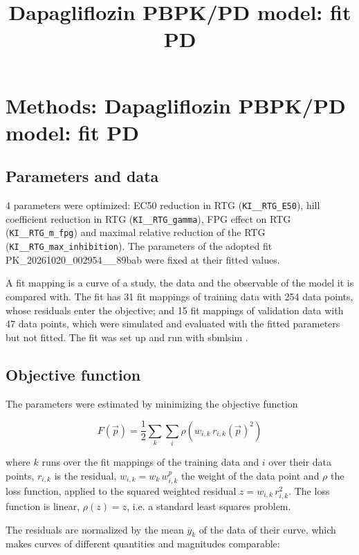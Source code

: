 \documentclass{article}
\title{Dapagliflozin PBPK/PD model: fit PD}
\date{}
\begin{document}
\maketitle

\section{Methods: Dapagliflozin PBPK/PD model: fit PD}

\subsection{Parameters and data}

4 parameters were optimized: EC50 reduction in RTG (\texttt{KI\_\_RTG\_E50}), hill coefficient reduction in RTG (\texttt{KI\_\_RTG\_gamma}), FPG effect on RTG (\texttt{KI\_\_RTG\_m\_fpg}) and maximal relative reduction of the RTG (\texttt{KI\_\_RTG\_max\_inhibition}). The parameters of the adopted fit PK\_20261020\_002954\_\_89bab were fixed at their fitted values.

A fit mapping is a curve of a study, the data and the observable of the model it is compared with. The fit has 31 fit mappings of training data with 254 data points, whose residuals enter the objective; and 15 fit mappings of validation data with 47 data points, which were simulated and evaluated with the fitted parameters but not fitted. The fit was set up and run with sbmlsim \cite{Koenig2026_sbmlsim}.

\subsection{Objective function}

The parameters were estimated by minimizing the objective function

\begin{equation}
F(\vec{p}) = \frac{1}{2} \sum_{k} \sum_{i} \rho\left(w_{i,k}\, r_{i,k}(\vec{p})^2\right)
\end{equation}

where $k$ runs over the fit mappings of the training data and $i$ over their data points, $r_{i,k}$ is the residual, $w_{i,k} = w_k\, w^{p}_{i,k}$ the weight of the data point and $\rho$ the loss function, applied to the squared weighted residual $z = w_{i,k}\, r_{i,k}^2$. The loss function is linear, $\rho(z) = z$, i.e. a standard least squares problem.

The residuals are normalized by the mean $\overline{y}_k$ of the data of their curve, which makes curves of different quantities and magnitudes comparable:
\end{document}
